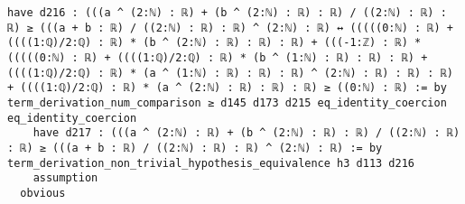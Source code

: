 \documentclass{article}
\begin{document}
\begin{tcolorbox}[colback=white!10, width=\linewidth]
\begin{lstlisting}[language=Lean4]
    have d216 : (((a ^ (2:ℕ) : ℝ) + (b ^ (2:ℕ) : ℝ) : ℝ) / ((2:ℕ) : ℝ) : ℝ) ≥ (((a + b : ℝ) / ((2:ℕ) : ℝ) : ℝ) ^ (2:ℕ) : ℝ) ↔ (((((0:ℕ) : ℝ) + ((((1:ℚ)/2:ℚ) : ℝ) * (b ^ (2:ℕ) : ℝ) : ℝ) : ℝ) + (((-1:ℤ) : ℝ) * (((((0:ℕ) : ℝ) + ((((1:ℚ)/2:ℚ) : ℝ) * (b ^ (1:ℕ) : ℝ) : ℝ) : ℝ) + ((((1:ℚ)/2:ℚ) : ℝ) * (a ^ (1:ℕ) : ℝ) : ℝ) : ℝ) ^ (2:ℕ) : ℝ) : ℝ) : ℝ) + ((((1:ℚ)/2:ℚ) : ℝ) * (a ^ (2:ℕ) : ℝ) : ℝ) : ℝ) ≥ ((0:ℕ) : ℝ) := by term_derivation_num_comparison ≥ d145 d173 d215 eq_identity_coercion eq_identity_coercion
    have d217 : (((a ^ (2:ℕ) : ℝ) + (b ^ (2:ℕ) : ℝ) : ℝ) / ((2:ℕ) : ℝ) : ℝ) ≥ (((a + b : ℝ) / ((2:ℕ) : ℝ) : ℝ) ^ (2:ℕ) : ℝ) := by term_derivation_non_trivial_hypothesis_equivalence h3 d113 d216
    assumption
  obvious

\end{lstlisting}
\end{tcolorbox}
\end{document}
